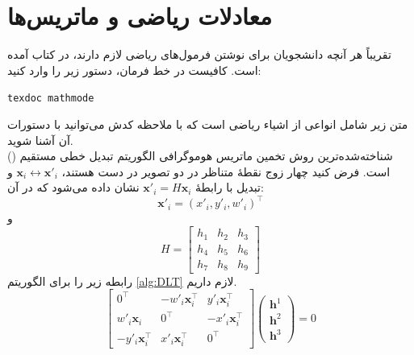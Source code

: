\section{معادلات ریاضی و ماتریس‌ها}
تقریباً هر آنچه دانشجویان برای نوشتن فرمول‌های ریاضی لازم دارند، در کتاب 
آمده است. کافیست در خط فرمان، دستور زیر را وارد کنید:
\begin{latin}
	\texttt{texdoc mathmode}
\end{latin}
متن زیر شامل انواعی از اشیاء ریاضی است که با ملاحظه کدش می‌توانید با دستورات آن آشنا شوید.\\
شناخته‌شده‌ترین روش تخمین ماتریس هوموگرافی الگوریتم تبدیل خطی مستقیم () است.  فرض کنید چهار زوج نقطهٔ متناظر در دو تصویر در دست هستند،  $\mathbf{x}_i\leftrightarrow\mathbf{x}'_i$   و تبدیل با رابطهٔ
  $\mathbf{x}'_i = H\mathbf{x}_i$
  نشان داده می‌شود که در آن:
\[\mathbf{x}'_i=(x'_i,y'_i,w'_i)^\top  \]
و
\[ H=\left[
\begin{array}{ccc}
h_1 & h_2 & h_3 \\ 
h_4 & h_5 & h_6 \\ 
h_7 & h_8 & h_9
\end{array} 
\right]\]
رابطه زیر را برای الگوریتم  \eqref{alg:DLT} لازم داریم.
\begin{equation}
\label{eq:DLT_Ah}
\left[
\begin{array}{ccc}
	0^\top & -w'_i\mathbf{x}_i^\top & y'_i\mathbf{x}_i^\top \\ 
	w'_i\mathbf{x}_i & 0^\top & -x'_i\mathbf{x}_i^\top \\ 
	- y'_i\mathbf{x}_i^\top & x'_i\mathbf{x}_i^\top & 0^\top
\end{array} 
\right]
\left(
\begin{array}{c}
	\mathbf{h}^1 \\ 
	\mathbf{h}^2 \\ 
	\mathbf{h}^3
\end{array} 
\right)=0
\end{equation}

